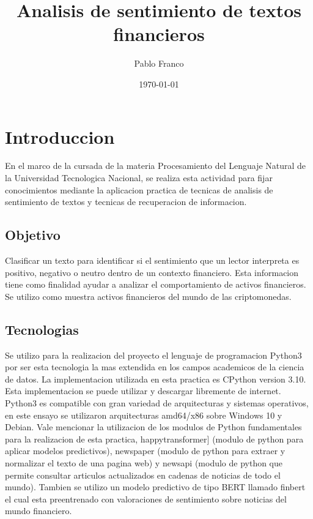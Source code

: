 \documentclass[12pt,jou]{apa7}
\title{Analisis de sentimiento de textos financieros}
\author{Pablo Franco}
\affiliation{Universidad Tecnologica Ncional}
\date{\today}
\begin{document}
\maketitle
\section{Introduccion}\label{sec:introduccion}
En el marco de la cursada de la materia Procesamiento del
Lenguaje Natural de la Universidad Tecnologica Nacional,
se realiza esta actividad para fijar conocimientos
mediante la aplicacion practica de tecnicas de analisis de
sentimiento de textos y tecnicas de recuperacion de informacion.
\subsection{Objetivo}\label{subsec:objetivo}
Clasificar un texto para identificar si el sentimiento
que un lector interpreta es positivo, negativo o neutro
dentro de un contexto financiero.
Esta informacion tiene como finalidad ayudar a
analizar el comportamiento de activos financieros.
Se utilizo como muestra activos financieros del mundo de las
criptomonedas.
\subsection{Tecnologias}\label{subsec:tecnologias}
Se utilizo para la realizacion del proyecto el lenguaje de programacion Python3\cite{cite_01}
por ser esta tecnologia la mas extendida en los campos academicos de la ciencia de datos.
La implementacion utilizada en esta practica es CPython version 3.10.
Esta implementacion se puede utilizar y descargar libremente de internet.
Python3 es compatible con gran variedad de arquitecturas y sistemas operativos,
en este ensayo se utilizaron arquitecturas amd64/x86 sobre Windows 10 y Debian.
Vale mencionar la utilizacion de los modulos de Python fundamentales para la
realizacion de esta practica, happytransformer]\cite{cite_02} (modulo de python para aplicar modelos
predictivos),
newspaper\cite{cite_03} (modulo de python para extraer y normalizar el texto de una pagina web) y
newsapi\cite{cite_04} (modulo de python que permite consultar articulos actualizados en cadenas
de noticias de todo el mundo).
Tambien se utilizo un modelo predictivo de tipo BERT llamado finbert\cite{cite_05}
el cual esta preentrenado con valoraciones de sentimiento sobre noticias del mundo financiero.
\end{document}
